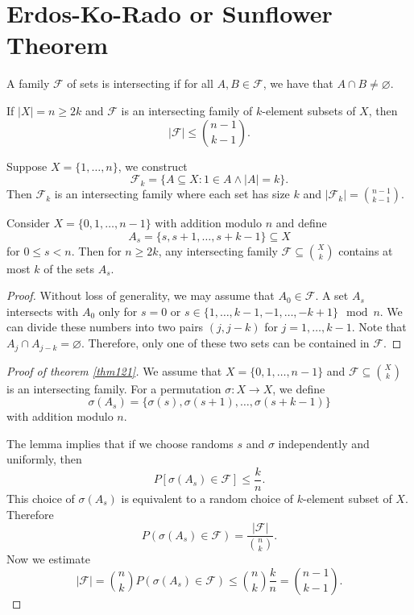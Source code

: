 \section{Erdos-Ko-Rado or Sunflower Theorem}
\begin{definition}
A family $\mathcal{F}$ of sets is intersecting if for all $A,B\in \mathcal{F}$, we have that $A\cap B\neq \varnothing$.
\end{definition}
\begin{theorem}\label{thm121}
If $|X|=n\ge 2k$ and $\mathcal{F}$ is an intersecting family of $k$-element subsets of $X$, then
$$
|\mathcal{F}|\le \binom{ n-1}{k-1 }.
$$
\end{theorem}
\begin{example}
Suppose $X=\{ 1,\dots,n \}$, we construct
$$
\mathcal{F}_{k}=\{ A\subseteq X:1\in A\land |A|=k\}.
$$
Then $\mathcal{F}_{k}$ is an intersecting family where each set has size $k$ and $|\mathcal{F}_{k}|=\binom{ n-1}{k-1 }$.
\end{example}
\begin{lemma}
Consider $X=\{ 0,1,\dots,n-1 \}$ with addition modulo $n$ and define 
$$
A_{s}=\{ s,s+1,\dots,s+k-1 \}\subseteq X
$$
for $0\le s<n$. Then for $n\ge 2k$, any intersecting family $\mathcal{F}\subseteq \binom{ X}{k }$ contains at most $k$ of the sets $A_{s}$.
\end{lemma}
\begin{proof}
Without loss of generality, we may assume that $A_{0}\in \mathcal{F}$. A set $A_{s}$ intersects with $A_{0}$ only for $s=0$ or $s \in \{ 1,\dots,k-1,-1,\dots,-k+1 \}\mod n$. We can divide these numbers into two pairs $(j,j-k)$ for $j=1,\dots,k-1$. Note that $A_{j}\cap A_{j-k}=\varnothing$. Therefore, only one of these two sets can be contained in $\mathcal{F}$. 
\end{proof}
\begin{proof}[Proof of theorem \ref{thm121}]
We assume that $X=\{ 0,1,\dots,n-1 \}$ and $\mathcal{F}\subseteq \binom{ X}{k }$ is an intersecting family. For a permutation $\sigma:X\to X$, we define
$$
\sigma(A_{s})=\{ \sigma(s),\sigma(s+1),\dots,\sigma(s+k-1) \}
$$
with addition modulo $n$. 

The lemma implies that if we choose randoms $s$ and $\sigma$ independently and uniformly, then 
$$
P[\sigma(A_{s})\in \mathcal{F}]\le \frac{k}{n}.
$$
This choice of $\sigma(A_{s})$ is equivalent to a random choice of $k$-element subset of $X$. Therefore
$$
P(\sigma(A_{s})\in \mathcal{F})=\frac{|\mathcal{F}|}{\binom{ n}{k } }.
$$
Now we estimate
$$
|\mathcal{F}|=\binom{ n}{k } P(\sigma(A_{s})\in \mathcal{F})\le \binom{ n}{k } \frac{k}{n}=\binom{ n-1}{k-1 } .
$$
\end{proof}


